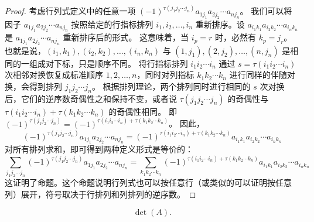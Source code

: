 \documentclass[10pt, a4paper, oneside, UTF8]{ctexbook}
\begin{document}
\begin{proof}
  考虑行列式定义中的任意一项 $(-1)^{\tau(j_1j_2 \cdots j_n)}
  a_{1j_1}a_{2j_2}\cdots a_{nj_n}$。
  我们可以将因子 $a_{1j_1}a_{2j_2}\cdots a_{nj_n}$ 按照给定的行指标排列 $i_1, i_2,
  \dots, i_n$ 重新排序。设 $a_{i_1k_1}a_{i_2k_2}\cdots a_{i_nk_n}$ 是
  $a_{1j_1}a_{2j_2}\cdots a_{nj_n}$ 重新排序后的形式。
  这意味着，当 $i_p=r$ 时，必然有 $k_p=j_r$。也就是说，$(i_1, k_1), (i_2, k_2), \dots,
  (i_n, k_n)$ 与 $(1, j_1), (2, j_2), \dots, (n, j_n)$ 是相同的一组成对下标，只是顺序不同。
  将行指标排列 $i_1i_2 \cdots i_n$ 通过 $s = \tau(i_1i_2 \cdots i_n)$
  次相邻对换恢复成标准顺序 $1, 2, \dots, n$，同时对列指标 $k_1k_2 \cdots k_n$
  进行同样的伴随对换，会得到排列 $j_1j_2 \cdots j_n$。
  根据排列理论，两个排列同时进行相同的 $s$ 次对换后，它们的逆序数奇偶性之和保持不变，或者说 $\tau(j_1j_2 \cdots
  j_n)$ 的奇偶性与 $\tau(i_1i_2 \cdots i_n) + \tau(k_1k_2 \cdots k_n)$ 的奇偶性相同。
  即 $(-1)^{\tau(j_1j_2 \cdots j_n)} = (-1)^{\tau(i_1i_2 \cdots i_n) +
  \tau(k_1k_2 \cdots k_n)}$。
  因此，
  \[
    (-1)^{\tau(j_1j_2 \cdots j_n)} a_{1j_1}a_{2j_2}\cdots a_{nj_n} =
    (-1)^{\tau(i_1i_2 \cdots i_n) + \tau(k_1k_2 \cdots k_n)}
    a_{i_1k_1}a_{i_2k_2}\cdots a_{i_nk_n}
  \]
  对所有排列求和，即可得到两种定义形式是等价的：
  \[
    \sum_{j_1j_2 \cdots j_n} (-1)^{\tau(j_1j_2 \cdots
    j_n)}a_{1j_1}a_{2j_2}\cdots a_{nj_n} = \sum_{k_1k_2 \cdots k_n}
    (-1)^{\tau(i_1i_2 \cdots i_n)+\tau(k_1k_2 \cdots
    k_n)}a_{i_1k_1}a_{i_2k_2}\cdots a_{i_nk_n}
  \]
  这证明了命题。这个命题说明行列式也可以按任意行（或类似的可以证明按任意列）展开，符号取决于行排列和列排列的逆序数。
\end{proof}

\[
  \det(A)
.\]
\end{document}
